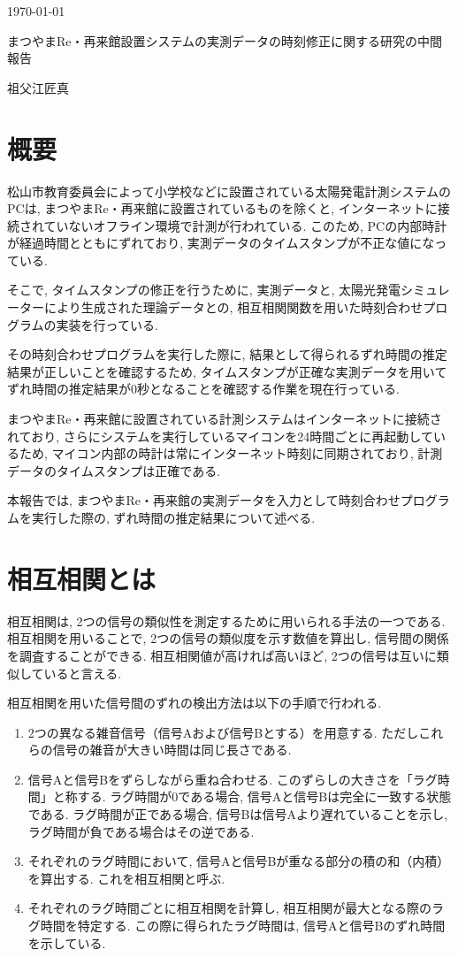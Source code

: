 \documentclass[a4j,12pt,]{jarticle}
\begin{document}
{\noindent\small  \hfill\today}
\begin{center}
  {\Large まつやまRe・再来館設置システムの実測データの時刻修正に関する研究の中間報告}
\end{center}
\begin{flushright}
  祖父江匠真 \\
\end{flushright}

\section{概要}
松山市教育委員会によって小学校などに設置されている太陽発電計測システムのPCは, まつやまRe・再来館に設置されているものを除くと, インターネットに接続されていないオフライン環境で計測が行われている. このため, PCの内部時計が経過時間とともにずれており, 実測データのタイムスタンプが不正な値になっている.

そこで, タイムスタンプの修正を行うために, 実測データと, 太陽光発電シミュレーターにより生成された理論データとの, 相互相関関数を用いた時刻合わせプログラムの実装を行っている.

その時刻合わせプログラムを実行した際に, 結果として得られるずれ時間の推定結果が正しいことを確認するため, タイムスタンプが正確な実測データを用いてずれ時間の推定結果が0秒となることを確認する作業を現在行っている.

まつやまRe・再来館に設置されている計測システムはインターネットに接続されており, さらにシステムを実行しているマイコンを24時間ごとに再起動しているため, マイコン内部の時計は常にインターネット時刻に同期されており, 計測データのタイムスタンプは正確である.

本報告では, まつやまRe・再来館の実測データを入力として時刻合わせプログラムを実行した際の, ずれ時間の推定結果について述べる.

\section{相互相関とは}
相互相関は, 2つの信号の類似性を測定するために用いられる手法の一つである. 相互相関を用いることで, 2つの信号の類似度を示す数値を算出し, 信号間の関係を調査することができる. 相互相関値が高ければ高いほど, 2つの信号は互いに類似していると言える.

相互相関を用いた信号間のずれの検出方法は以下の手順で行われる\cite{1}.

\begin{enumerate}
  \item 2つの異なる雑音信号（信号Aおよび信号Bとする）を用意する. ただしこれらの信号の雑音が大きい時間は同じ長さである.
  \item 信号Aと信号Bをずらしながら重ね合わせる. このずらしの大きさを「ラグ時間」と称する. ラグ時間が0である場合, 信号Aと信号Bは完全に一致する状態である. ラグ時間が正である場合, 信号Bは信号Aより遅れていることを示し, ラグ時間が負である場合はその逆である.
  \item それぞれのラグ時間において, 信号Aと信号Bが重なる部分の積の和（内積）を算出する. これを相互相関と呼ぶ.
  \item それぞれのラグ時間ごとに相互相関を計算し, 相互相関が最大となる際のラグ時間を特定する. この際に得られたラグ時間は, 信号Aと信号Bのずれ時間を示している.
\end{enumerate}
\end{document}
